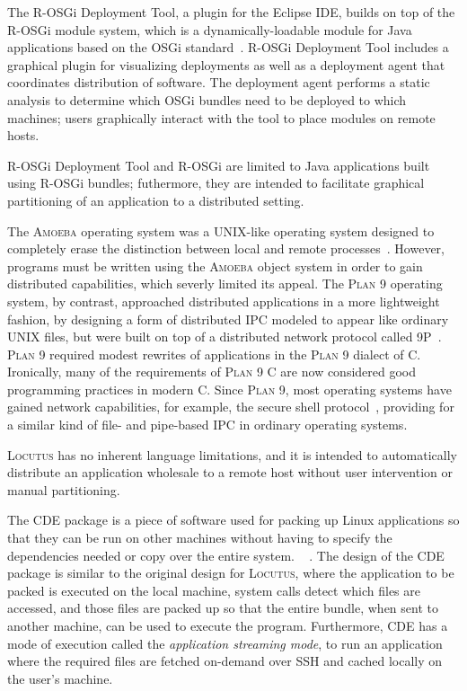\documentclass[11pt]{article}
\newcommand{\ninep}{\textsc{9P}\xspace}
\newcommand{\amoeba}{\textsc{Amoeba}\xspace}
\newcommand{\locutus}{\textsc{Locutus}\xspace}
\newcommand{\plannine}{\textsc{Plan 9}\xspace}
\newcommand{\rosgig}{R-OSGi Deployment Tool\xspace}
\newcommand{\rosgi}{R-OSGi\xspace}
\newcommand{\cde}{\textsc{CDE}\xspace}
\begin{document}
The \rosgig, a plugin for the Eclipse IDE, builds on top of the \rosgi module system, which is a dynamically-loadable module for Java applications based on the OSGi standard~\cite{10.5555/1785080.1785082, 10.1145/1328279.1328290}.   \rosgig includes a graphical plugin for visualizing deployments as well as a deployment agent that coordinates distribution of software.  The deployment agent performs a static analysis to determine which OSGi bundles need to be deployed to which machines; users graphically interact with the tool to place modules on remote hosts.

\rosgig and \rosgi are limited to Java applications built using \rosgi bundles; futhermore, they are intended to facilitate graphical partitioning of an application to a distributed setting.

The \amoeba operating system was a UNIX-like operating system designed to completely erase the distinction between local and remote processes~\cite{10.1109/2.53354}.  However, programs must be written using the \amoeba object system in order to gain distributed capabilities, which severly limited its appeal.  The \plannine operating system, by contrast, approached distributed applications in a more lightweight fashion, by designing a form of distributed IPC modeled to appear like ordinary UNIX files, but were built on top of a distributed network protocol called \ninep~\cite{DBLP:journals/csys/PikePDFTT95}.  \plannine required modest rewrites of applications in the \plannine dialect of C.  Ironically, many of the requirements of \plannine C are now considered good programming practices in modern C.  Since \plannine, most operating systems have gained network capabilities, for example, the secure shell protocol~\cite{10.5555/1267569.1267573}, providing for a similar kind of file- and pipe-based IPC in ordinary operating systems.

\locutus has no inherent language limitations, and it is intended to automatically distribute an application wholesale to a remote host without user intervention or manual partitioning.




The \cde package is a piece of software used for packing up Linux applications so that they can be run on other machines without having to specify the dependencies needed or copy over the entire system. ~\cite{10.1109/MCSE.2012.36} \cite{10.5555/2002181.2002202}. The design of the \cde package is similar to the original design for \locutus, where the application to be packed is executed on the local machine, system calls detect which files are accessed, and those files are packed up so that the entire bundle, when sent to another machine, can be used to execute the program. Furthermore, \cde has a mode of execution called the \textit{application streaming mode}, to run an application where the required files are fetched on-demand over SSH and cached locally on the user's machine.
\end{document}

